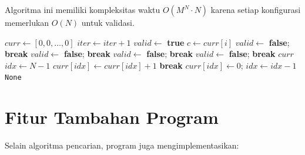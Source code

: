 Algoritma ini memiliki kompleksitas waktu \textbf{$O(M^N \cdot N)$} karena setiap konfigurasi memerlukan $O(N)$ untuk validasi.

\begin{algorithm}[H]
\caption{Algoritma Brute Force Queens}
\begin{algorithmic}[1]
    \State $curr \gets [0, 0, \dots, 0]$ 
        \State $iter \gets iter + 1$
        \State $valid \gets$ \textbf{true}
            \State $c \gets curr[i]$
             $valid \gets$ \textbf{false}; \textbf{break} \EndIf
                 $valid \gets$ \textbf{false}; \textbf{break} \EndIf {}
                 $valid \gets$ \textbf{false}; \textbf{break} \EndIf {}
            \EndFor
             $valid \gets$ \textbf{false}; \textbf{break} \EndIf {}
        \EndFor
         \Return $curr$ 
        \EndIf
        \State {}
        \State $idx \gets N - 1$
            \State $curr[idx] \gets curr[idx] + 1$
             \textbf{break} \EndIf
            \State $curr[idx] \gets 0$; $idx \gets idx - 1$
        \EndWhile
         \Return \texttt{None} 
        \EndIf
    \EndWhile
\EndProcedure
\end{algorithmic}
\end{algorithm}

\section{Fitur Tambahan Program}

Selain algoritma pencarian, program juga mengimplementasikan:

